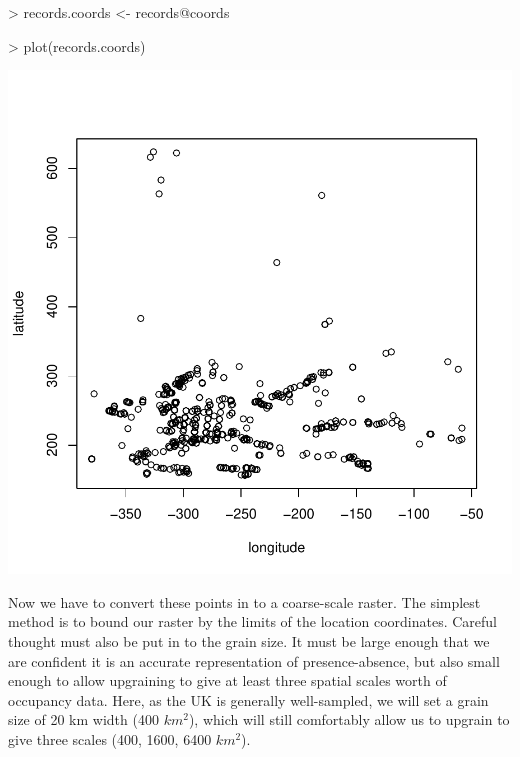 \documentclass{article}[12pt, a4paper]
\begin{document}
\begin{Schunk}
\begin{Sinput}
> records.coords <- records@coords
\end{Sinput}
\end{Schunk}
\begin{Schunk}
\begin{Sinput}
> plot(records.coords)
\end{Sinput}
\end{Schunk}
\includegraphics{Downscaling-downscale30}

Now we have to convert these points in to a coarse-scale raster. The simplest method is to bound our raster by the limits of the location coordinates. Careful thought must also be put in to the grain size. It must be large enough that we are confident it is an accurate representation of presence-absence, but also small enough to allow upgraining to give at least three spatial scales worth of occupancy data. Here, as the UK is generally well-sampled, we will set a grain size of 20 km width (400 $km^{2}$), which will still comfortably allow us to upgrain to give three scales (400, 1600, 6400 $km^{2}$).
\end{document}
